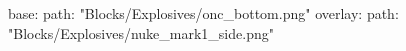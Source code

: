 base:
  path: "Blocks/Explosives/onc_bottom.png"
overlay:
  path: "Blocks/Explosives/nuke_mark1_side.png"